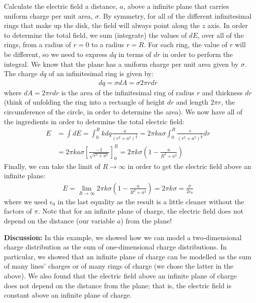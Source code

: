 \begin{example}{\label{ex:chargesfields:squarecircle}Calculate the electric field a distance, $a$, above a infinite plane that carries uniform charge per unit area, $\sigma$.}
By symmetry, for all of the different infinitesimal rings that make up the disk, the field will always point along the $z$ axis. In order to determine the total field, we sum (integrate) the values of $dE$, over all of the rings, from a radius of $r=0$ to a radius $r=R$. For each ring, the value of $r$ will be different, so we need to express $dq$ in terms of $dr$ in order to perform the integral. We know that the plane has a uniform charge per unit area given by $\sigma$. The charge $dq$ of an infinitesimal ring is given by:
\begin{align*}
dq = \sigma dA=\sigma 2\pi r dr
\end{align*}
where $dA=2\pi r dr$ is the area of the infinitesimal ring of radius $r$ and thickness $dr$ (think of unfolding the ring into a rectangle of height $dr$ and length $2\pi r$, the circumference of the circle, in order to determine the area). We now have all of the ingredients in order to determine the total electric field:
\begin{align*}
E &= \int dE = \int_0^R kdq\frac{a}{(r^2+a^2)^\frac{3}{2}}  = 2\pi k a \sigma \int_0^R \frac{r}{(r^2+a^2)^\frac{3}{2}}dr\\
&=2\pi k a \sigma \left[  \frac{-1}{\sqrt{r^2+a^2}}\right]_0^R=2\pi k  \sigma\left(1-\frac{a}{R^2+a^2} \right)
\end{align*}
Finally, we can take the limit of $R\to\infty$ in order to get the electric field above an infinite plane:
\begin{align*}
E=\lim_{R\to\infty}2\pi k  \sigma\left(1-\frac{a}{R^2+a^2} \right)=2\pi k\sigma=\frac{\sigma}{2\epsilon_0}
\end{align*}
where we used $\epsilon_0$ in the last equality as the result is a little cleaner without the factors of $\pi$. Note that for an infinite plane of charge, the electric field does not depend on the distance (our variable $a$) from the plane!

\textbf{Discussion:} In this example, we showed how we can model a two-dimensional charge distribution as the sum of one-dimensional charge distributions. In particular, we showed that an infinite plane of charge can be modelled as the sum of many lines' charges or of many rings of charge (we chose the latter in the above). We also found that the electric field above an infinite plane of charge does not depend on the distance from the plane; that is, the electric field is constant above an infinite plane of charge. 
\end{example}


